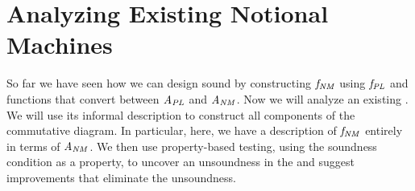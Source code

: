 \section{Analyzing Existing Notional Machines}
\label{chr:RevealingInconsistencies}

So far we have seen
how we can design sound \nms{} by
constructing \ensuremath{\Varid{f}_{\Conid{NM}}} using \ensuremath{\Varid{f}_{\Conid{PL}}} and
functions that convert between \ensuremath{\Conid{A}_{\Conid{PL}}} and \ensuremath{\Conid{A}_{\Conid{NM}}}.
%
Now we will analyze an existing \nm{}.
We will use its informal description to construct all components of the commutative diagram.
In particular, here,
we have a description
of \ensuremath{\Varid{f}_{\Conid{NM}}} entirely in terms of \ensuremath{\Conid{A}_{\Conid{NM}}}.
%
We then use property-based testing, using the soundness condition as a property,
to uncover an unsoundness in the \nm{}
and suggest improvements that eliminate the unsoundness.
















